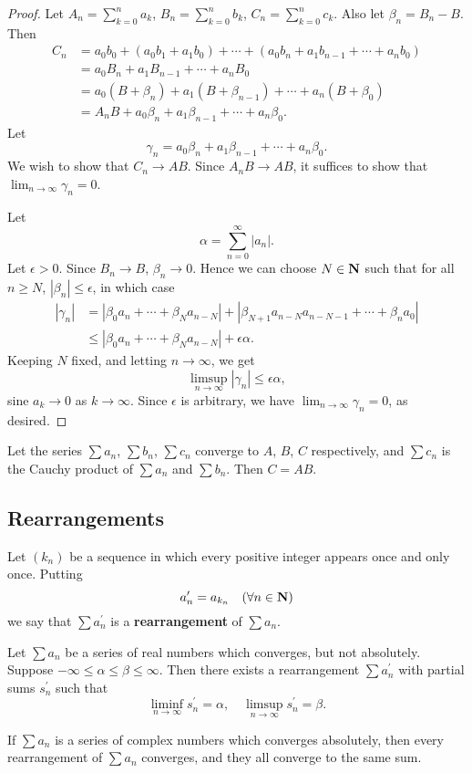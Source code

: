 \begin{proof}
Let $\displaystyle A_n=\sum_{k=0}^{n}a_k$, $\displaystyle B_n=\sum_{k=0}^{n}b_k$, $\displaystyle C_n=\sum_{k=0}^{n}c_k$. Also let $\beta_n=B_n-B$. Then 
\begin{align*}
C_n&=a_0b_0+(a_0b_1+a_1b_0)+\cdots+(a_0b_n+a_1b_{n-1}+\cdots+a_nb_0)\\
&=a_0B_n+a_1B_{n-1}+\cdots+a_nB_0\\
&=a_0(B+\beta_n)+a_1(B+\beta_{n-1})+\cdots+a_n(B+\beta_0)\\
&=A_nB+a_0\beta_n+a_1\beta_{n-1}+\cdots+a_n\beta_0.
\end{align*}
Let
\[\gamma_n=a_0\beta_n+a_1\beta_{n-1}+\cdots+a_n\beta_0.\]
We wish to show that $C_n\to AB$. Since $A_nB\to AB$, it suffices to show that $\displaystyle\lim_{n\to\infty}\gamma_n=0$.

Let 
\[\alpha=\sum_{n=0}^{\infty}|a_n|.\]
Let $\epsilon>0$. Since $B_n\to B$, $\beta_n\to0$. Hence we can choose $N\in\mathbf N$ such that for all $n\ge N$, $|\beta_n|\le\epsilon$, in which case
\begin{align*}
|\gamma_n|&=|\beta_0a_n+\cdots+\beta_Na_{n-N}|+|\beta_{N+1}a_{n-N}a_{n-N-1}+\cdots+\beta_na_0|\\
&\le|\beta_0a_n+\cdots+\beta_Na_{n-N}|+\epsilon\alpha.
\end{align*}
Keeping $N$ fixed, and letting $n\to\infty$, we get
\[\limsup_{n\to\infty}|\gamma_n|\le\epsilon\alpha,\]
sine $a_k\to0$ as $k\to\infty$. Since $\epsilon$ is arbitrary, we have $\displaystyle\lim_{n\to\infty}\gamma_n=0$, as desired.
\end{proof}

\begin{theorem}[Abel]
Let the series $\sum a_n$, $\sum b_n$, $\sum c_n$ converge to $A$, $B$, $C$ respectively, and $\sum c_n$ is the Cauchy product of $\sum a_n$ and $\sum b_n$. Then $C=AB$.
\end{theorem}

\subsection{Rearrangements}
\begin{definition}[Rearrangement]
Let $(k_n)$ be a sequence in which every positive integer appears once and only once. Putting
\[a_n^\prime=a_{k_n}\quad(\forall n\in\mathbf N)\]
we say that $\sum a_n^\prime$ is a \textbf{rearrangement} of $\sum a_n$.
\end{definition}

\begin{proposition}
Let $\sum a_n$ be a series of real numbers which converges, but not absolutely. Suppose $-\infty\le\alpha\le\beta\le\infty$. Then there exists a rearrangement $\sum a_n^\prime$ with partial sums $s_n^\prime$ such that
\[\liminf_{n\to\infty}s_n^\prime=\alpha,\quad\limsup_{n\to\infty}s_n^\prime=\beta.\]
\end{proposition}

\begin{proposition}
If $\sum a_n$ is a series of complex numbers which converges absolutely, then every rearrangement of $\sum a_n$ converges, and they all converge to the same sum.
\end{proposition}